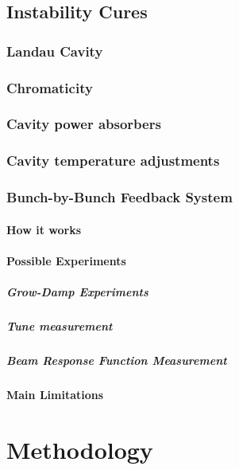 \section{Instability Cures}
\subsection{Landau Cavity}
\subsection{Chromaticity}
\subsection{Cavity power absorbers}
\subsection{Cavity temperature adjustments}
\subsection{Bunch-by-Bunch Feedback System}
\subsubsection{How it works}
\subsubsection{Possible Experiments}
\paragraph{Grow-Damp Experiments}
\paragraph{Tune measurement}
\paragraph{Beam Response Function Measurement}
\subsubsection{Main Limitations}

\chapter{Methodology}
\section{}

